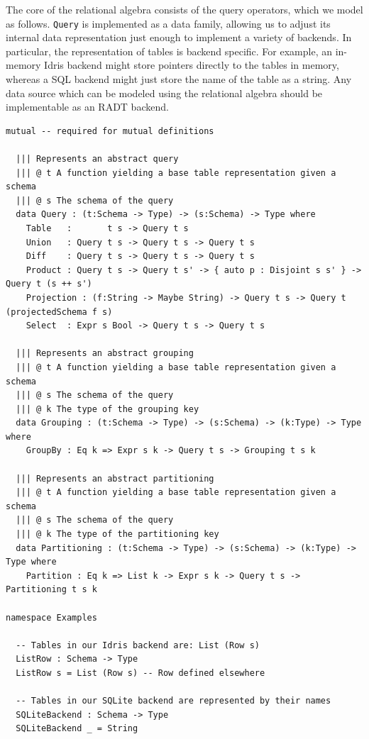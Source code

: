 \documentclass[12pt]{report}
\begin{document}
The core of the relational algebra consists of the query operators, which we model as follows.
\texttt{Query} is implemented as a data family, allowing us to adjust its internal data representation just enough to implement a variety of backends.
In particular, the representation of tables is backend specific.
For example, an in-memory Idris backend might store pointers directly to the tables in memory, whereas a SQL backend might just store the name of the table as a string.
Any data source which can be modeled using the relational algebra should be implementable as an RADT backend.

\begin{lstlisting}[caption={Abstract representation of queries},label={lst:queries}]
mutual -- required for mutual definitions

  ||| Represents an abstract query
  ||| @ t A function yielding a base table representation given a schema
  ||| @ s The schema of the query
  data Query : (t:Schema -> Type) -> (s:Schema) -> Type where
    Table   :       t s -> Query t s
    Union   : Query t s -> Query t s -> Query t s
    Diff    : Query t s -> Query t s -> Query t s
    Product : Query t s -> Query t s' -> { auto p : Disjoint s s' } -> Query t (s ++ s')
    Projection : (f:String -> Maybe String) -> Query t s -> Query t (projectedSchema f s)
    Select  : Expr s Bool -> Query t s -> Query t s

  ||| Represents an abstract grouping
  ||| @ t A function yielding a base table representation given a schema
  ||| @ s The schema of the query
  ||| @ k The type of the grouping key
  data Grouping : (t:Schema -> Type) -> (s:Schema) -> (k:Type) -> Type where
    GroupBy : Eq k => Expr s k -> Query t s -> Grouping t s k

  ||| Represents an abstract partitioning
  ||| @ t A function yielding a base table representation given a schema
  ||| @ s The schema of the query
  ||| @ k The type of the partitioning key
  data Partitioning : (t:Schema -> Type) -> (s:Schema) -> (k:Type) -> Type where
    Partition : Eq k => List k -> Expr s k -> Query t s -> Partitioning t s k

namespace Examples

  -- Tables in our Idris backend are: List (Row s)
  ListRow : Schema -> Type
  ListRow s = List (Row s) -- Row defined elsewhere

  -- Tables in our SQLite backend are represented by their names
  SQLiteBackend : Schema -> Type
  SQLiteBackend _ = String
\end{lstlisting}
\end{document}
